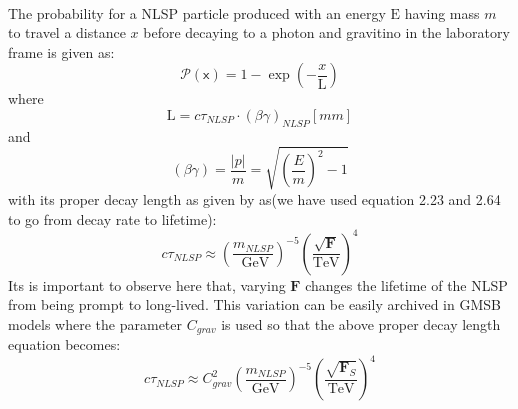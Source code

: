 {\paragraph*{}
The probability for a NLSP particle produced with an energy $\displaystyle{\mathrm{E}}$ having mass $m$ to travel a distance $x$ before decaying to a photon and gravitino in the laboratory frame is given as:
\begin{equation}\label{prop}
\displaystyle{\mathcal{P}(\mathsf{x}) = 1 - \exp{\left(- \frac{x}{\mathrm{L}} \right)} }
\end{equation}
where
\begin{equation}\label{dl}
\displaystyle{\mathrm{L} = c\tau_{NLSP}\cdot\left(\beta\gamma\right)_{NLSP} [mm]}
\end{equation}
and
\begin{equation}\label{ctau}
\displaystyle{\left(\beta\gamma\right) = \frac{|p|}{m} = \sqrt{\left(\frac{E}{m}\right)^{2} - 1} }
\end{equation}
with its proper decay length as given by as(we have used equation 2.23 and \label{drate} 2.64 to go from decay rate to lifetime):
\begin{equation}\label{DRate}
c\tau_{NLSP} \approx \left(\frac{m_{NLSP}}{\mbox{ GeV}}\right)^{-5}\left(\frac{\sqrt{\mathbf{F}}}{\mbox{TeV}}\right)^{4}
\end{equation}
Its is important to observe here that, varying $\mathbf{F}$ changes the lifetime of the NLSP from being prompt to long-lived.
This variation can be easily archived in GMSB models where the parameter $C_{grav}$ is used so that the above proper decay length equation becomes:
\begin{equation}\label{pdlength}
c\tau_{NLSP} \approx C^{2}_{grav} \left(\frac{m_{NLSP}}{\mbox{GeV}}\right)^{-5}\left(\frac{\sqrt{\mathbf{F}_{S}}}{\mbox{TeV}}\right)^{4}
\end{equation}

}
